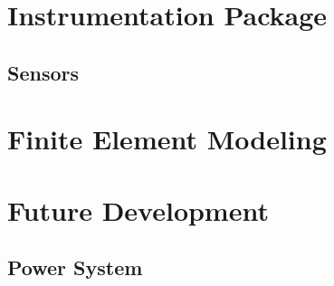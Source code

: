 \documentclass[12pt,doublespace]{report}
\begin{document}



\chapter{Instrumentation Package}





\section{Sensors}









\chapter{Finite Element Modeling}

\chapter{Future Development}
\section{Power System}
\end{document}
